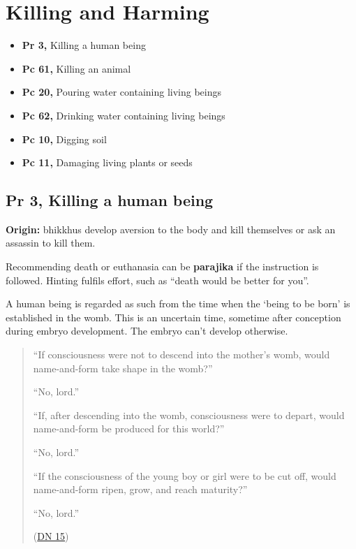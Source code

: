 \chapter{Killing and Harming}

\begin{itemize}
\tightlist
\item
  \textbf{Pr 3,} Killing a human being
\item
  \textbf{Pc 61,} Killing an animal
\item
  \textbf{Pc 20,} Pouring water containing living beings
\item
  \textbf{Pc 62,} Drinking water containing living beings
\item
  \textbf{Pc 10,} Digging soil
\item
  \textbf{Pc 11,} Damaging living plants or seeds
\end{itemize}

\section{Pr 3, Killing a human being}


\textbf{Origin:} bhikkhus develop aversion to the body and kill
themselves or ask an assassin to kill them.

Recommending death or euthanasia can be \textbf{parajika} if the
instruction is followed. Hinting fulfils effort, such as ``death would
be better for you''.

A human being is regarded as such from the time when the `being to be
born' is established in the womb. This is an uncertain time, sometime
after conception during embryo development. The embryo can't develop
otherwise.

\clearpage

\begin{quote}
``If consciousness were not to descend into the mother's womb, would
name-and-form take shape in the womb?''

``No, lord.''

``If, after descending into the womb, consciousness were to depart,
would name-and-form be produced for this world?''

``No, lord.''

``If the consciousness of the young boy or girl were to be cut off,
would name-and-form ripen, grow, and reach maturity?''

``No, lord.''

(\href{https://www.accesstoinsight.org/tipitaka/dn/dn.15.0.than.html}{DN
15})
\end{quote}

